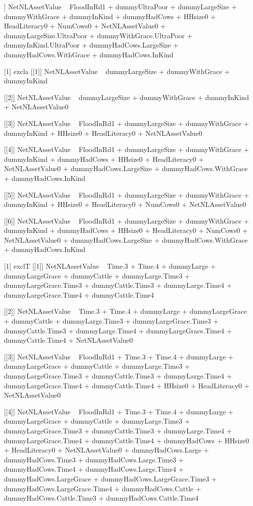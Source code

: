 \begin{Schunk}
\begin{Soutput}
[[6]]
NetNLAssetValue ~ FloodInRd1 + dummyUltraPoor + dummyLargeSize + 
    dummyWithGrace + dummyInKind + dummyHadCows + HHsize0 + HeadLiteracy0 + 
    NumCows0 + NetNLAssetValue0 + dummyLargeSize.UltraPoor + 
    dummyWithGrace.UltraPoor + dummyInKind.UltraPoor + dummyHadCows.LargeSize + 
    dummyHadCows.WithGrace + dummyHadCows.InKind

[1] excla
[[1]]
NetNLAssetValue ~ dummyLargeSize + dummyWithGrace + dummyInKind

[[2]]
NetNLAssetValue ~ dummyLargeSize + dummyWithGrace + dummyInKind + 
    NetNLAssetValue0

[[3]]
NetNLAssetValue ~ FloodInRd1 + dummyLargeSize + dummyWithGrace + 
    dummyInKind + HHsize0 + HeadLiteracy0 + NetNLAssetValue0

[[4]]
NetNLAssetValue ~ FloodInRd1 + dummyLargeSize + dummyWithGrace + 
    dummyInKind + dummyHadCows + HHsize0 + HeadLiteracy0 + NetNLAssetValue0 + 
    dummyHadCows.LargeSize + dummyHadCows.WithGrace + dummyHadCows.InKind

[[5]]
NetNLAssetValue ~ FloodInRd1 + dummyLargeSize + dummyWithGrace + 
    dummyInKind + HHsize0 + HeadLiteracy0 + NumCows0 + NetNLAssetValue0

[[6]]
NetNLAssetValue ~ FloodInRd1 + dummyLargeSize + dummyWithGrace + 
    dummyInKind + dummyHadCows + HHsize0 + HeadLiteracy0 + NumCows0 + 
    NetNLAssetValue0 + dummyHadCows.LargeSize + dummyHadCows.WithGrace + 
    dummyHadCows.InKind

[1] exclT
[[1]]
NetNLAssetValue ~ Time.3 + Time.4 + dummyLarge + dummyLargeGrace + 
    dummyCattle + dummyLarge.Time3 + dummyLargeGrace.Time3 + 
    dummyCattle.Time3 + dummyLarge.Time4 + dummyLargeGrace.Time4 + 
    dummyCattle.Time4

[[2]]
NetNLAssetValue ~ Time.3 + Time.4 + dummyLarge + dummyLargeGrace + 
    dummyCattle + dummyLarge.Time3 + dummyLargeGrace.Time3 + 
    dummyCattle.Time3 + dummyLarge.Time4 + dummyLargeGrace.Time4 + 
    dummyCattle.Time4 + NetNLAssetValue0

[[3]]
NetNLAssetValue ~ FloodInRd1 + Time.3 + Time.4 + dummyLarge + 
    dummyLargeGrace + dummyCattle + dummyLarge.Time3 + dummyLargeGrace.Time3 + 
    dummyCattle.Time3 + dummyLarge.Time4 + dummyLargeGrace.Time4 + 
    dummyCattle.Time4 + HHsize0 + HeadLiteracy0 + NetNLAssetValue0

[[4]]
NetNLAssetValue ~ FloodInRd1 + Time.3 + Time.4 + dummyLarge + 
    dummyLargeGrace + dummyCattle + dummyLarge.Time3 + dummyLargeGrace.Time3 + 
    dummyCattle.Time3 + dummyLarge.Time4 + dummyLargeGrace.Time4 + 
    dummyCattle.Time4 + dummyHadCows + HHsize0 + HeadLiteracy0 + 
    NetNLAssetValue0 + dummyHadCows.Large + dummyHadCows.Time3 + 
    dummyHadCows.Large.Time3 + dummyHadCows.Time4 + dummyHadCows.Large.Time4 + 
    dummyHadCows.LargeGrace + dummyHadCows.LargeGrace.Time3 + 
    dummyHadCows.LargeGrace.Time4 + dummyHadCows.Cattle + dummyHadCows.Cattle.Time3 + 
    dummyHadCows.Cattle.Time4


\end{Soutput}
\end{Schunk}

